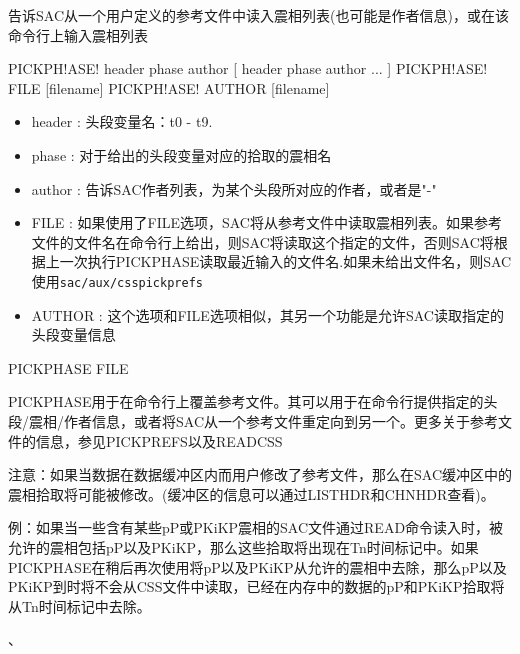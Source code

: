 \label{cmd:pickphase}

告诉SAC从一个用户定义的参考文件中读入震相列表(也可能是作者信息)，或在该命令行上输入震相列表

\begin{SACSTX}
PICKPH!ASE! header phase author [ header phase author ... ]
PICKPH!ASE! FILE [filename]
PICKPH!ASE! AUTHOR [filename]
\end{SACSTX}

\begin{itemize}
\item header : 头段变量名：t0 - t9. 
\item phase : 对于给出的头段变量对应的拾取的震相名 
\item author : 告诉SAC作者列表，为某个头段所对应的作者，或者是"-" 
\item FILE : 如果使用了FILE选项，SAC将从参考文件中读取震相列表。如果参考文件的文件名在命令行上给出，则SAC将读取这个指定的文件，否则SAC将根据上一次执行PICKPHASE读取最近输入的文件名.如果未给出文件名，则SAC使用\texttt{sac/aux/csspickprefs}
\item AUTHOR : 这个选项和FILE选项相似，其另一个功能是允许SAC读取指定的头段变量信息
\end{itemize}

PICKPHASE FILE

PICKPHASE用于在命令行上覆盖参考文件。其可以用于在命令行提供指定的头段/震相/作者信息，或者将SAC从一个参考文件重定向到另一个。更多关于参考文件的信息，参见PICKPREFS以及READCSS

注意：如果当数据在数据缓冲区内而用户修改了参考文件，那么在SAC缓冲区中的震相拾取将可能被修改。(缓冲区的信息可以通过LISTHDR和CHNHDR查看)。

例：如果当一些含有某些pP或PKiKP震相的SAC文件通过READ命令读入时，被允许的震相包括pP以及PKiKP，那么这些拾取将出现在Tn时间标记中。如果PICKPHASE在稍后再次使用将pP以及PKiKP从允许的震相中去除，那么pP以及PKiKP到时将不会从CSS文件中读取，已经在内存中的数据的pP和PKiKP拾取将从Tn时间标记中去除。

、
